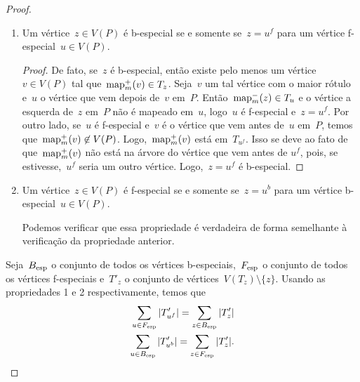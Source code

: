 \begin{proof}
\begin{enumerate}
		\item Um vértice~${z\in V(P)}$ é b-especial se e somente 
		se~${z=u^f}$ para um vértice
		f-especial~${u\in V(P)}$.
		\begin{proof}

		De fato, se~$z$ é b-especial,
		então existe pelo menos um vértice~${v\in V(P)}$ tal
		que~${\mathrm{map}^+_m(v)\in T_{z}}$.
		Seja~$v$ um tal vértice com o maior rótulo e~$u$ o vértice 
		que vem depois de~$v$ em~$P$. 
		Então~${\mathrm{map}^-_m(z)\in T_u}$ e o vértice a esquerda
		de~$z$ em~$P$ não é
		mapeado em~$u$, logo~$u$ é f-especial e~${z=u^f}$.
		Por outro lado, se~$u$ é f-especial 
		e~$v$ é o vértice que vem antes 
		de~$u$ em~$P$, temos que~${\mathrm{map}^+_m(v)\not\in V(P)}$. 
		Logo,~$\mathrm{map}^+_m(v)$ está em~$T_{u^f}$.
		Isso se deve ao fato de que~$\mathrm{map}^+_m(v)$ não está na 
		árvore 
		do vértice que vem antes de
		$u^f$, pois, se estivesse,~$u^f$ seria um outro
		vértice.
		Logo,~${z=u^f}$ é b-especial. 

		\end{proof}

		\item Um vértice~${z\in V(P)}$ é f-especial se e somente 
		se~${z=u^b}$ para um vértice b-especial~${u\in V(P)}$. 

		Podemos verificar que essa propriedade é verdadeira de forma
		semelhante à verificação da propriedade anterior.
	\end{enumerate}

	Seja~$B_{\mathrm{esp}}$ 
	o conjunto de todos os vértices b-especiais,~$F_{\mathrm{esp}}$ o
	conjunto de todos os vértices f-especiais e~$T'_z$ o conjunto de 
	vértices~${V(T_z)\setminus \{z\}}$. 
	Usando as propriedades 
	1 e 2 respectivamente, temos que
	\begin{align}
		\displaystyle\sum_{u\in F_{\mathrm{esp}}}|T_{u^f}'| = 
		\displaystyle\sum_{z\in B_{\mathrm{esp}}}|T_{z}'| \label{eq:4}\\
		\displaystyle\sum_{u\in B_{\mathrm{esp}}}|T_{u^b}'| = 
		\displaystyle\sum_{z\in F_{\mathrm{esp}}}|T_{z}'| \label{eq:3}.
	\end{align}


\end{proof}
